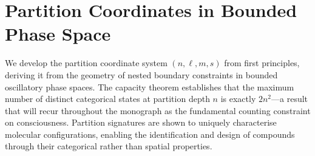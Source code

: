 \chapter{Partition Coordinates in Bounded Phase Space}
\label{ch:partition_coords}


\begin{chapterabstract}
We develop the partition coordinate system $(n, \ell, m, s)$ from first principles, deriving it from the geometry of nested boundary constraints in bounded oscillatory phase spaces. The capacity theorem establishes that the maximum number of distinct categorical states at partition depth $n$ is exactly $2n^2$---a result that will recur throughout the monograph as the fundamental counting constraint on consciousness. Partition signatures are shown to uniquely characterise molecular configurations, enabling the identification and design of compounds through their categorical rather than spatial properties.
\end{chapterabstract}


